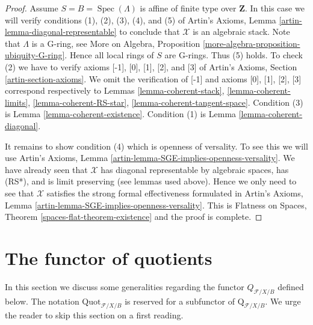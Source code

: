 \documentclass{stacks-project}
\theoremstyle{plain}
\theoremstyle{definition}
\theoremstyle{remark}
\numberwithin{equation}{subsection}
\def\Spec{\mathop{\mathrm{Spec}}}
\def\Quotfunctor{\mathrm{Quot}}
\begin{document}
\begin{proof}
\medskip\noindent
Assume $S = B = \Spec(\Lambda)$ is affine of finite type over $\mathbf{Z}$.
In this case we will verify conditions (1), (2), (3), (4), and (5) of
Artin's Axioms, Lemma \ref{artin-lemma-diagonal-representable}
to conclude that $\mathcal{X}$ is an algebraic stack.
Note that $\Lambda$ is a G-ring, see
More on Algebra, Proposition \ref{more-algebra-proposition-ubiquity-G-ring}.
Hence all local rings of $S$ are G-rings. Thus (5) holds.
To check (2) we have to verify axioms [-1], [0], [1], [2], and [3]
of Artin's Axioms, Section \ref{artin-section-axioms}.
We omit the verification of [-1] and axioms
[0], [1], [2], [3] correspond respectively to
Lemmas \ref{lemma-coherent-stack},
\ref{lemma-coherent-limits},
\ref{lemma-coherent-RS-star},
\ref{lemma-coherent-tangent-space}.
Condition (3) is Lemma \ref{lemma-coherent-existence}.
Condition (1) is Lemma \ref{lemma-coherent-diagonal}.

\medskip\noindent
It remains to show condition (4) which is openness of versality.
To see this we will use
Artin's Axioms, Lemma \ref{artin-lemma-SGE-implies-openness-versality}.
We have already seen that $\mathcal{X}$ has diagonal
representable by algebraic spaces, has (RS*), and is limit preserving
(see lemmas used above).
Hence we only need to see that $\mathcal{X}$ satisfies the strong
formal effectiveness formulated in
Artin's Axioms, Lemma \ref{artin-lemma-SGE-implies-openness-versality}.
This is Flatness on Spaces, Theorem \ref{spaces-flat-theorem-existence}
and the proof is complete.
\end{proof}









\section{The functor of quotients}
\label{section-functor-quotients}

\noindent
In this section we discuss some generalities regarding the functor
$Q_{\mathcal{F}/X/B}$ defined below.
The notation $\Quotfunctor_{\mathcal{F}/X/B}$ is reserved for a
subfunctor of $\text{Q}_{\mathcal{F}/X/B}$.
We urge the reader to skip this section on a first reading.
\end{document}
